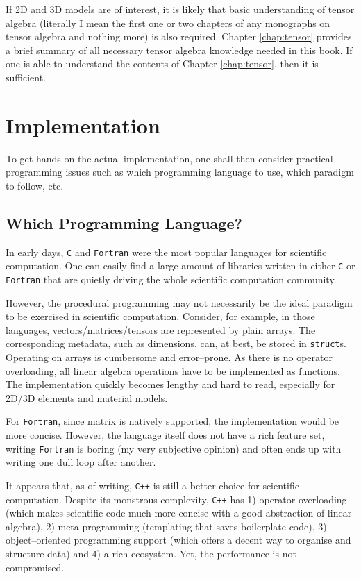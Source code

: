 If 2D and 3D models are of interest, it is likely that basic understanding of tensor algebra (literally I mean the first one or two chapters of any monographs on tensor algebra and nothing more) is also required.
Chapter \ref{chap:tensor} provides a brief summary of all necessary tensor algebra knowledge needed in this book.
If one is able to understand the contents of Chapter \ref{chap:tensor}, then it is sufficient.
\section{Implementation}
To get hands on the actual implementation, one shall then consider practical programming issues such as which programming language to use, which paradigm to follow, etc.
\subsection{Which Programming Language?}
In early days, \texttt{C} and \texttt{Fortran} were the most popular languages for scientific computation.
One can easily find a large amount of libraries written in either \texttt{C} or \texttt{Fortran} that are quietly driving the whole scientific computation community.

However, the procedural programming may not necessarily be the ideal paradigm to be exercised in scientific computation.
Consider, for example, in those languages, vectors/matrices/tensors are represented by plain arrays.
The corresponding metadata, such as dimensions, can, at best, be stored in \texttt{struct}s.
Operating on arrays is cumbersome and error--prone.
As there is no operator overloading, all linear algebra operations have to be implemented as functions.
The implementation quickly becomes lengthy and hard to read, especially for 2D/3D elements and material models.

For \texttt{Fortran}, since matrix is natively supported, the implementation would be more concise.
However, the language itself does not have a rich feature set, writing \texttt{Fortran} is boring (my very subjective opinion) and often ends up with writing one dull loop after another.

It appears that, as of writing, \texttt{C++} is still a better choice for scientific computation.
Despite its monstrous complexity, \texttt{C++} has 1) operator overloading (which makes scientific code much more concise with a good abstraction of linear algebra), 2) meta-programming (templating that saves boilerplate code), 3) object--oriented programming support (which offers a decent way to organise and structure data) and 4) a rich ecosystem.
Yet, the performance is not compromised.
